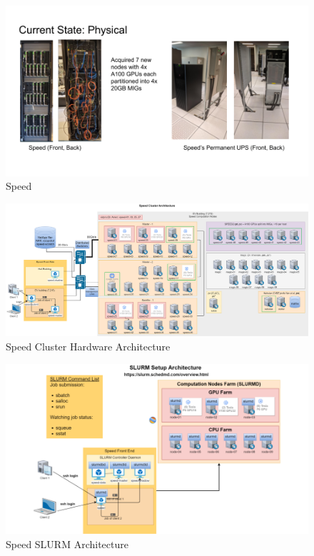 \documentclass{easychair}
\begin{document}
\begin{figure}[htpb]
	\centering
	\includegraphics[width=\columnwidth]{images/speed-pics}
	\caption{Speed}
	\label{fig:speed-pics}
\end{figure}

\begin{figure}[htpb]
	\centering
	\includegraphics[width=\columnwidth]{images/speed-architecture-full}
	\caption{Speed Cluster Hardware Architecture}
	\label{fig:speed-architecture-full}
\end{figure}

\begin{figure}[htpb]
	\centering
	\includegraphics[width=\columnwidth]{images/slurm-arch}
	\caption{Speed SLURM Architecture}
	\label{fig:slurm-arch}
\end{figure}
\end{document}
